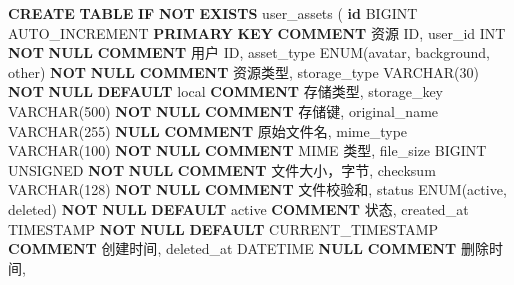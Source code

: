 \documentclass[
  a4paper,
  UTF8]{ctexart}
\newenvironment{Shaded}{}{}
\newcommand{\ControlFlowTok}[1]{\textcolor[rgb]{0.00,0.44,0.13}{\textbf{#1}}}
\newcommand{\DataTypeTok}[1]{\textcolor[rgb]{0.56,0.13,0.00}{#1}}
\newcommand{\DecValTok}[1]{\textcolor[rgb]{0.25,0.63,0.44}{#1}}
\newcommand{\FunctionTok}[1]{\textcolor[rgb]{0.02,0.16,0.49}{#1}}
\newcommand{\KeywordTok}[1]{\textcolor[rgb]{0.00,0.44,0.13}{\textbf{#1}}}
\newcommand{\NormalTok}[1]{#1}
\newcommand{\StringTok}[1]{\textcolor[rgb]{0.25,0.44,0.63}{#1}}
\begin{document}
\begin{Shaded}
\begin{Highlighting}[]
\KeywordTok{CREATE} \KeywordTok{TABLE} \ControlFlowTok{IF} \KeywordTok{NOT} \KeywordTok{EXISTS}\NormalTok{ user\_assets (}
  \KeywordTok{id}\NormalTok{ BIGINT AUTO\_INCREMENT }\KeywordTok{PRIMARY} \KeywordTok{KEY} \KeywordTok{COMMENT} \StringTok{\textquotesingle{}资源 ID\textquotesingle{}}\NormalTok{,}
\NormalTok{  user\_id }\DataTypeTok{INT} \KeywordTok{NOT} \KeywordTok{NULL} \KeywordTok{COMMENT} \StringTok{\textquotesingle{}用户 ID\textquotesingle{}}\NormalTok{,}
\NormalTok{  asset\_type ENUM(}\StringTok{\textquotesingle{}avatar\textquotesingle{}}\NormalTok{, }\StringTok{\textquotesingle{}background\textquotesingle{}}\NormalTok{, }\StringTok{\textquotesingle{}other\textquotesingle{}}\NormalTok{) }\KeywordTok{NOT} \KeywordTok{NULL} \KeywordTok{COMMENT} \StringTok{\textquotesingle{}资源类型\textquotesingle{}}\NormalTok{,}
\NormalTok{  storage\_type }\DataTypeTok{VARCHAR}\NormalTok{(}\DecValTok{30}\NormalTok{) }\KeywordTok{NOT} \KeywordTok{NULL} \KeywordTok{DEFAULT} \StringTok{\textquotesingle{}local\textquotesingle{}} \KeywordTok{COMMENT} \StringTok{\textquotesingle{}存储类型\textquotesingle{}}\NormalTok{,}
\NormalTok{  storage\_key }\DataTypeTok{VARCHAR}\NormalTok{(}\DecValTok{500}\NormalTok{) }\KeywordTok{NOT} \KeywordTok{NULL} \KeywordTok{COMMENT} \StringTok{\textquotesingle{}存储键\textquotesingle{}}\NormalTok{,}
\NormalTok{  original\_name }\DataTypeTok{VARCHAR}\NormalTok{(}\DecValTok{255}\NormalTok{) }\KeywordTok{NULL} \KeywordTok{COMMENT} \StringTok{\textquotesingle{}原始文件名\textquotesingle{}}\NormalTok{,}
\NormalTok{  mime\_type }\DataTypeTok{VARCHAR}\NormalTok{(}\DecValTok{100}\NormalTok{) }\KeywordTok{NOT} \KeywordTok{NULL} \KeywordTok{COMMENT} \StringTok{\textquotesingle{}MIME 类型\textquotesingle{}}\NormalTok{,}
\NormalTok{  file\_size BIGINT UNSIGNED }\KeywordTok{NOT} \KeywordTok{NULL} \KeywordTok{COMMENT} \StringTok{\textquotesingle{}文件大小，字节\textquotesingle{}}\NormalTok{,}
\NormalTok{  checksum }\DataTypeTok{VARCHAR}\NormalTok{(}\DecValTok{128}\NormalTok{) }\KeywordTok{NOT} \KeywordTok{NULL} \KeywordTok{COMMENT} \StringTok{\textquotesingle{}文件校验和\textquotesingle{}}\NormalTok{,}
\NormalTok{  status ENUM(}\StringTok{\textquotesingle{}active\textquotesingle{}}\NormalTok{, }\StringTok{\textquotesingle{}deleted\textquotesingle{}}\NormalTok{) }\KeywordTok{NOT} \KeywordTok{NULL} \KeywordTok{DEFAULT} \StringTok{\textquotesingle{}active\textquotesingle{}} \KeywordTok{COMMENT} \StringTok{\textquotesingle{}状态\textquotesingle{}}\NormalTok{,}
\NormalTok{  created\_at }\DataTypeTok{TIMESTAMP} \KeywordTok{NOT} \KeywordTok{NULL} \KeywordTok{DEFAULT} \FunctionTok{CURRENT\_TIMESTAMP} \KeywordTok{COMMENT} \StringTok{\textquotesingle{}创建时间\textquotesingle{}}\NormalTok{,}
\NormalTok{  deleted\_at DATETIME }\KeywordTok{NULL} \KeywordTok{COMMENT} \StringTok{\textquotesingle{}删除时间\textquotesingle{}}\NormalTok{,}


\end{Highlighting}
\end{Shaded}
\end{document}
